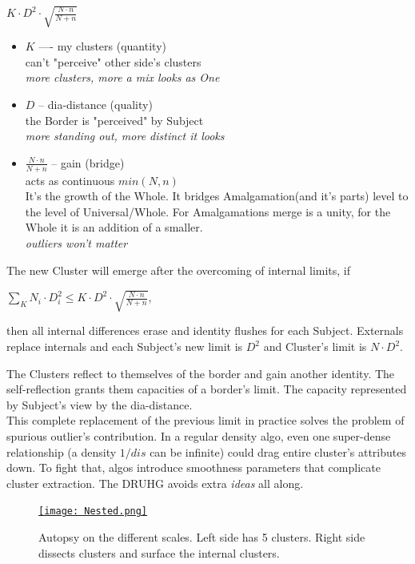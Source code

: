 \documentclass[12pt, a4paper, twocolumn]{article}
\newcommand{\githubPics}{https://raw.githubusercontent.com/artamono/druhg/master/papers/druhg/}
\begin{document}
\centerline{$K \cdot D^2 \cdot \sqrt{\frac{N \cdot n}{N + n}}$ } %
\begin{itemize}
  \item $K$ —- my clusters (quantity)
    \\ can't "perceive" other side's clusters
    \\ \textit{more clusters, more a mix looks as One}
  \item $D$ -- dia-distance (quality)
    \\ the Border is "perceived" by Subject
    \\ \textit{more standing out, more distinct it looks}
  \item $\frac{N \cdot n}{N + n}$ -- gain (bridge)
    \\ acts as continuous $min(N, n)$
    \\ It's the growth of the Whole. It bridges Amalgamation(and it's parts) level to the level of Universal/Whole. For Amalgamations merge is a unity, for the Whole it is an addition of a smaller.
    \\ \textit{outliers won't matter}
\end{itemize}

The new Cluster will emerge after the overcoming of internal limits, if
\vspace{\myvspace}
\centerline{$\sum_K N_{i} \cdot D^2_{i} \leq K \cdot D^2 \cdot \sqrt{\frac{N \cdot n}{N + n}}$,}
then all internal differences erase and identity flushes for each Subject. Externals replace internals and each Subject's new limit is $D^2$ and Cluster's limit is $N \cdot D^2$.

The Clusters reflect to themselves of the border and gain another identity. The self-reflection grants them capacities of a border's limit. The capacity represented by Subject's view by the dia-distance.
\\ This complete replacement of the previous limit in practice solves the problem of spurious outlier's contribution. In a regular density algo, even one super-dense relationship (a density $1/dis$ can be infinite) could drag entire cluster's attributes down. To fight that, algos introduce smoothness parameters that complicate cluster extraction. The DRUHG avoids extra \textit{ideas} all along.

\begin{figure}[H]
  \centering
  \href{\githubPics Nested.png}{\texttt{[image: Nested.png]}}
  \centering
  \caption{Autopsy on the different scales. Left side has 5 clusters. Right side dissects clusters and surface the internal clusters.}
  \label{fig:Nested}
\end{figure}
\end{document}
